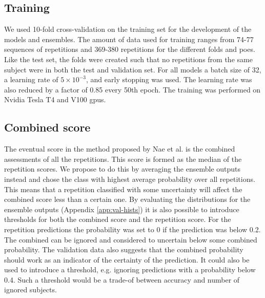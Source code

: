 \subsection{Training} \label{sec:met-training}
We used 10-fold cross-validation on the training set for the development of the models and ensembles. The amount of data used for training ranges from 74-77 sequences of repetitions and 369-380 repetitions for the different folds and \glspl{poe}. Like the test set, the folds were created such that no repetitions from the same subject were in both the test and validation set. For all models a batch size of 32, a learning rate of $5 \times 10^{-3}$, and early stopping was used. The learning rate was also reduced by a factor of 0.85 every 50th epoch. The training was performed on Nvidia Tesla T4 and V100 \glspl{gpu}.


\subsection{Combined score} \label{sec:met-combined}
The eventual score in the method proposed by Nae et al. \cite{Nae2020b} is the combined assessments of all the repetitions. This score is formed as the median of the repetition scores. We propose to do this by averaging the ensemble outputs instead and chose the class with highest average probability over all repetitions. This means that a repetition classified with some uncertainty will affect the combined score less than a certain one. By evaluating the distributions for the ensemble outputs (Appendix \ref{app:val-hists}) it is also possible to introduce thresholds for both the combined score and the repetition score. For the repetition predictions the probability was set to 0 if the prediction was below 0.2. The combined can be ignored and considered to uncertain below some combined probability. The validation data also suggests that the combined probability should work as an indicator of the certainty of the prediction. It could also be used to introduce a threshold, e.g. ignoring predictions with a probability below 0.4. Such a threshold would be a trade-of between accuracy and number of ignored subjects.
